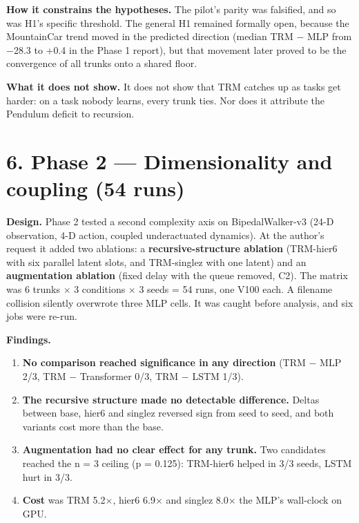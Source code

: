 \documentclass[11pt]{article}
\begin{document}
\textbf{How it constrains the hypotheses.} The pilot's parity was falsified, and so was H1's specific threshold. The general H1 remained formally open, because the MountainCar trend moved in the predicted direction (median TRM $-$ MLP from $-$28.3 to +0.4 in the Phase 1 report), but that movement later proved to be the convergence of all trunks onto a shared floor.



\textbf{What it does not show.} It does not show that TRM catches up as tasks get harder: on a task nobody learns, every trunk ties. Nor does it attribute the Pendulum deficit to recursion.



\medskip



\section*{6. Phase 2 --- Dimensionality and coupling (54 runs)}



\textbf{Design.} Phase 2 tested a second complexity axis on BipedalWalker-v3 (24-D observation, 4-D action, coupled underactuated dynamics). At the author's request it added two ablations: a \textbf{recursive-structure ablation} (TRM-hier6 with six parallel latent slots, and TRM-singlez with one latent) and an \textbf{augmentation ablation} (fixed delay with the queue removed, C2). The matrix was 6 trunks $\times$ 3 conditions $\times$ 3 seeds = 54 runs, one V100 each. A filename collision silently overwrote three MLP cells. It was caught before analysis, and six jobs were re-run.



\textbf{Findings.}

\begin{enumerate}
\item \textbf{No comparison reached significance in any direction} (TRM $-$ MLP 2/3, TRM $-$ Transformer 0/3, TRM $-$ LSTM 1/3).
\item \textbf{The recursive structure made no detectable difference.} Deltas between base, hier6 and singlez reversed sign from seed to seed, and both variants cost more than the base.
\item \textbf{Augmentation had no clear effect for any trunk.} Two candidates reached the n = 3 ceiling (p = 0.125): TRM-hier6 helped in 3/3 seeds, LSTM hurt in 3/3.
\item \textbf{Cost} was TRM 5.2$\times$, hier6 6.9$\times$ and singlez 8.0$\times$ the MLP's wall-clock on GPU.
\end{enumerate}
\end{document}
